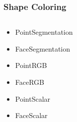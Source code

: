 \documentclass[compress]{beamer}
\begin{document}
\begin{frame}
	\frametitle{Shape Coloring}
	
	\begin{columns}
    		\begin{column}{.4\linewidth}
      		\begin{itemize}
			\item<1> PointSegmentation
			\item<1> FaceSegmentation
			\item<2> PointRGB
			\item<2> FaceRGB
			\item<3> PointScalar
			\item<3> FaceScalar
		\end{itemize}
   		\end{column}
    		\begin{column}{.6\linewidth}
		
			 \begin{figure}[h]
				\centering
			\end{figure}
      
    		\end{column}
  	\end{columns}
	
\end{frame}
\end{document}
